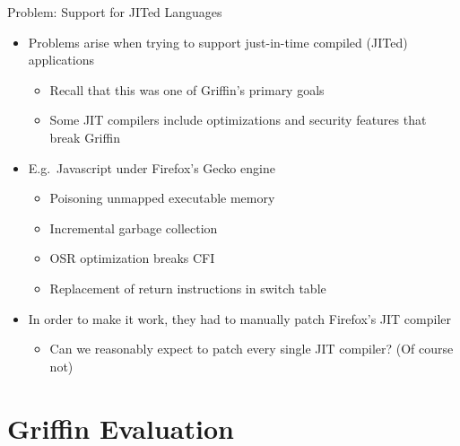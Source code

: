 \documentclass[12pt, dvipsnames, aspectratio=169]{beamer}
\begin{document}
\begin{frame}[c]{Problem: Support for JITed Languages}{}
  \begin{itemize}
    \item Problems arise when trying to support just-in-time compiled (JITed) applications
    \begin{itemize}
      \item Recall that this was one of Griffin's primary goals
      \item Some JIT compilers include optimizations and security features that break Griffin
    \end{itemize}

    \vfill
    \item E.g.~Javascript under Firefox's Gecko engine
    \begin{itemize}
      \item Poisoning unmapped executable memory
      \item Incremental garbage collection
      \item OSR optimization breaks CFI
      \item Replacement of return instructions in switch table
    \end{itemize}

    \vfill
    \item In order to make it work, they had to manually patch Firefox's JIT compiler
    \begin{itemize}
      \item Can we reasonably expect to patch every single JIT compiler? (Of course not)
    \end{itemize}
  \end{itemize}
\end{frame}

\section{Griffin Evaluation}
\end{document}
